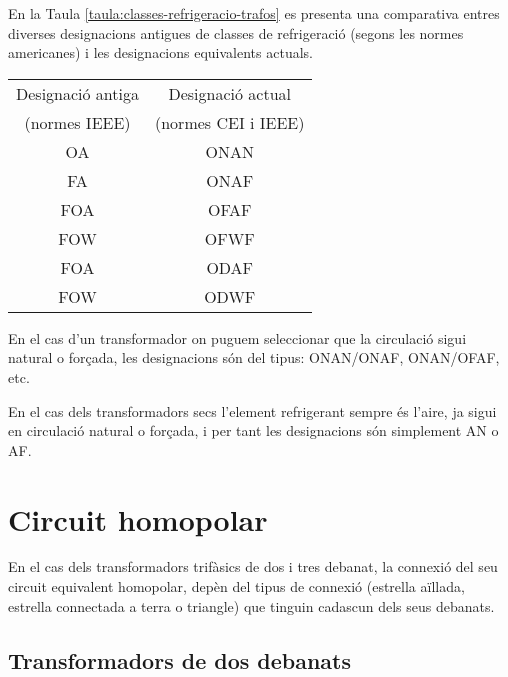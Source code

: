 En la Taula \vref{taula:classes-refrigeracio-trafos} es presenta una
comparativa entres diverses designacions antigues de classes de
refrigeració (segons les normes americanes) i les designacions
equivalents actuals.

\begin{center}
   \label{taula:classes-refrigeracio-trafos}
   \begin{tabular}{cc}
   \toprule[1pt]
   Designació antiga & Designació actual \\
   (normes IEEE)     & (normes CEI i IEEE) \\
   \midrule
   OA & ONAN   \\
   FA & ONAF   \\
   FOA & OFAF  \\
   FOW & OFWF  \\
   FOA & ODAF  \\
   FOW & ODWF \\
   \bottomrule[1pt]
   \end{tabular}
\end{center}

En el cas d'un transformador on puguem seleccionar que la circulació
sigui natural o forçada,
les designacions són del tipus: ONAN/ONAF, ONAN/OFAF, etc.

En el cas dels transformadors secs l'element refrigerant sempre és
l'aire, ja sigui en circulació natural o forçada, i per tant les
designacions són simplement AN o AF.





\section{Circuit homopolar}\label{sec:circuit_homopolar}

En el cas dels transformadors trifàsics de dos i tres debanat, la connexió del seu circuit equivalent homopolar, depèn del tipus de connexió (estrella aïllada, estrella connectada a terra o triangle) que tinguin cadascun dels seus debanats.

\subsection{Transformadors de dos debanats}\label{sec:cir-hom-2-deb}

